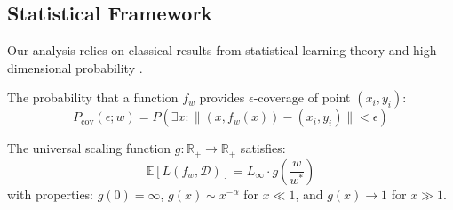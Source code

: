 \subsection{Statistical Framework}

Our analysis relies on classical results from statistical learning theory \cite{vapnik1971uniform} and high-dimensional probability \cite{vershynin2018high}.

\begin{definition}
The probability that a function $f_w$ provides $\epsilon$-coverage of point $(x_i, y_i)$:
$$P_{\text{cov}}(\epsilon; w) = P\left(\exists x : \|(x, f_w(x)) - (x_i, y_i)\| < \epsilon\right)$$
\end{definition}

\begin{definition}
The universal scaling function $g: \mathbb{R}_+ \to \mathbb{R}_+$ satisfies:
$$\mathbb{E}[L(f_w, \mathcal{D})] = L_\infty \cdot g\left(\frac{w}{w^*}\right)$$
with properties: $g(0) = \infty$, $g(x) \sim x^{-\alpha}$ for $x \ll 1$, and $g(x) \to 1$ for $x \gg 1$.
\end{definition}